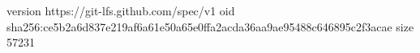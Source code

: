version https://git-lfs.github.com/spec/v1
oid sha256:ce5b2a6d837e219af6a61e50a65e0ffa2acda36aa9ae95488c646895c2f3acae
size 57231
